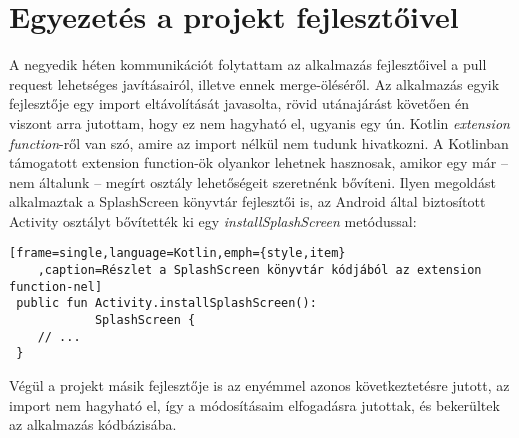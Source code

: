 \section{Egyezetés a projekt fejlesztőivel}
A negyedik héten kommunikációt folytattam az alkalmazás fejlesztőivel a pull request lehetséges
javításairól, illetve ennek merge-öléséről. Az alkalmazás egyik fejlesztője egy import
eltávolítását javasolta, rövid utánajárást követően \cite{extensionfunction} én viszont arra jutottam, hogy ez nem
hagyható el, ugyanis egy ún. Kotlin \textit{extension function}-ről van szó, amire az import
nélkül nem tudunk hivatkozni. A Kotlinban támogatott extension function-ök olyankor lehetnek
hasznosak, amikor egy már -- nem általunk -- megírt osztály lehetőségeit szeretnénk bővíteni.
Ilyen megoldást alkalmaztak a SplashScreen könyvtár fejlesztői is, az Android által biztosított
Activity osztályt bővítették ki egy \textit{installSplashScreen} metódussal:

\begin{lstlisting}[frame=single,language=Kotlin,emph={style,item}
    ,caption=Részlet a SplashScreen könyvtár kódjából az extension function-nel]
 public fun Activity.installSplashScreen():
            SplashScreen {
    // ...
 }
\end{lstlisting}

Végül a projekt másik fejlesztője is az enyémmel azonos következtetésre jutott, az import
nem hagyható el, így a módosításaim elfogadásra jutottak, és bekerültek az alkalmazás kódbázisába.

